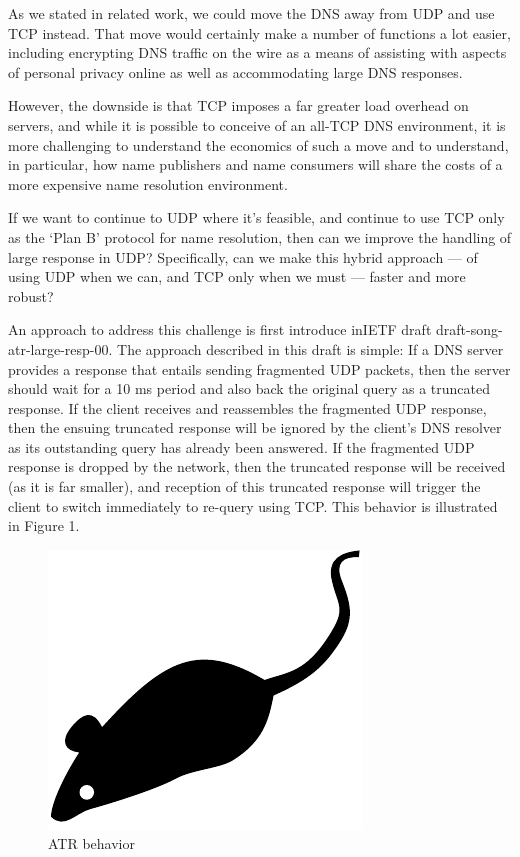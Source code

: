 As we stated in related work, we could move the DNS away from UDP and use TCP instead. That move would certainly make a number of functions a lot easier, including encrypting DNS traffic on the wire as a means of assisting with aspects of personal privacy online as well as accommodating large DNS responses.

However, the downside is that TCP imposes a far greater load overhead on servers, and while it is possible to conceive of an all-TCP DNS environment, it is more challenging to understand the economics of such a move and to understand, in particular, how name publishers and name consumers will share the costs of a more expensive name resolution environment.

If we want to continue to UDP where it’s feasible, and continue to use TCP only as the ‘Plan B’ protocol for name resolution, then can we improve the handling of large response in UDP? Specifically, can we make this hybrid approach — of using UDP when we can, and TCP only when we must — faster and more robust?

An approach to address this challenge is first introduce inIETF draft draft-song-atr-large-resp-00. The approach described in this draft is simple: If a DNS server provides a response that entails sending fragmented UDP packets, then the server should wait for a 10 ms period and also back the original query as a truncated response. If the client receives and reassembles the fragmented UDP response, then the ensuing truncated response will be ignored by the client’s DNS resolver as its outstanding query has already been answered. If the fragmented UDP response is dropped by the network, then the truncated response will be received (as it is far smaller), and reception of this truncated response will trigger the client to switch immediately to re-query using TCP. This behavior is illustrated in Figure 1.

\begin{figure}[tp]
\centering
\includegraphics{figures/mouse}
\caption{ATR behavior}
\end{figure}

